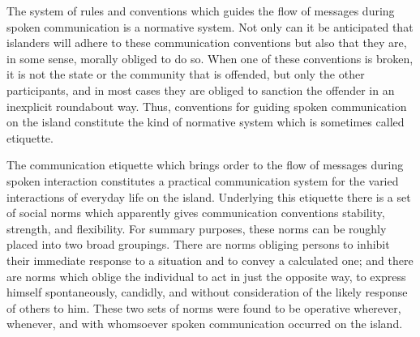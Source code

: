 \documentclass[openany,nobib]{tufte-book}
\begin{document}
The system of rules and conventions which guides the flow of messages
during spoken communication is a normative system. Not only can it be
anticipated that islanders will adhere to these communication
conventions but also that they are, in some sense, morally obliged to do
so. When one of these conventions is broken, it is not the state or the
community that is offended, but only the other participants, and in most
cases they are obliged to sanction the offender in an inexplicit
roundabout way. Thus, conventions for guiding spoken communication on
the island constitute the kind of normative system which is sometimes
called etiquette.

The communication etiquette which brings order to the flow of messages
during spoken interaction constitutes a practical communication system
for the varied interactions of everyday life on the island. Underlying
this etiquette there is a set of social norms which apparently gives
communication conventions stability, strength, and flexibility. For
summary purposes, these norms can be roughly placed into two broad
groupings. There are norms obliging persons to inhibit their immediate
response to a situation and to convey a calculated one; and there are
norms which oblige the individual to act in just the opposite way, to
express himself spontaneously, candidly, and without consideration of
the likely response of others to him. These two sets of norms were found
to be operative wherever, whenever, and with whomsoever spoken
communication occurred on the island.
\end{document}
